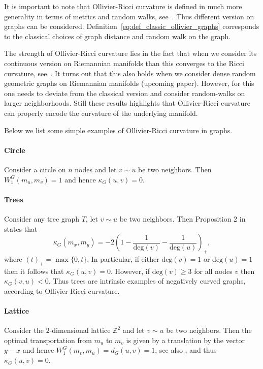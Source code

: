 \documentclass{article}
\begin{document}
It is important to note that Ollivier-Ricci curvature is defined in much more generality in terms of metrics and random walks, see~\cite{ollivier2009ricci}. Thus different version on graphs can be considered. Definition~\eqref{eq:def_classic_ollivier_graphs} corresponds to the classical choices of graph distance and random walk on the graph.

The strength of Ollivier-Ricci curvature lies in the fact that when we consider its continuous version on Riemannian manifolds than this converges to the Ricci curvature, see~\cite[Example 7]{ollivier2009ricci}. It turns out that this also holds when we consider dense random geometric graphs on Riemannian manifolds (upcoming paper). However, for this one needs to deviate from the classical version and consider random-walks on larger neighborhoods. Still these results highlights that Ollivier-Ricci curvature can properly encode the curvature of the underlying manifold. 

Below we list some simple examples of Ollivier-Ricci curvature in graphs.

\paragraph{Circle}

Consider a circle on $n$ nodes and let $v \sim u$ be two neighbors. Then $W_1^G(m_u,m_v) = 1$ and hence $\kappa_G(u,v) = 0$.

\paragraph{Trees}

Consider any tree graph $T$, let $v \sim u$ be two neighbors. Then Proposition 2 in \cite{jost2014ollivier} states that
\[
	\kappa_G(m_x,m_y) = -2\left(1 - \frac{1}{\mathrm{deg}(v)} - \frac{1}{\mathrm{deg}(u)}\right)_+, 
\]
where $(t)_+ = \max\{0,t\}$. In particular, if either $\mathrm{deg}(v) = 1$ or $\mathrm{deg}(u) = 1$ then it follows that $\kappa_G(u,v) = 0$. However, if $\mathrm{deg}(v) \ge 3$ for all nodes $v$ then $\kappa_G(v,u) < 0$. Thus trees are intrinsic examples of negatively curved graphs, according to Ollivier-Ricci curvature.

\paragraph{Lattice}
Consider the $2$-dimensional lattice $\mathbb{Z}^2$ and let $v \sim u$ be two neighbors. Then the optimal transportation from $m_u$ to $m_v$ is given by a translation by the vector $y - x$ and hence $W_1^G(m_v,m_u) = d_G(u,v) = 1$, see also \cite[Example 5]{ollivier2009ricci}, and thus $\kappa_G(u,v) = 0$.
\end{document}
